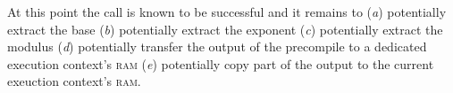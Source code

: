 

\begin{center}
\end{center}
At this point the  call is known to be successful and it remains to
(\emph{a}) potentially extract the base
(\emph{b}) potentially extract the exponent
(\emph{c}) potentially extract the modulus
(\emph{d}) potentially transfer the output of the precompile to a dedicated execution context's \textsc{ram}
(\emph{e}) potentially copy part of the output to the current exeuction context's \textsc{ram}.
